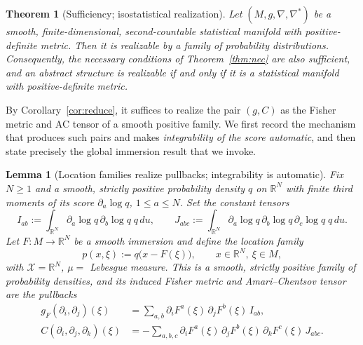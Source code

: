 \documentclass{amsart}
\newtheorem{theorem}{Theorem}
\newtheorem{lemma}{Lemma}
\theoremstyle{definition}
\theoremstyle{remark}
\begin{document}
\begin{theorem}[Sufficiency; isostatistical realization]\label{thm:suff}
Let $(M,g,\nabla,\nabla^{*})$ be a smooth, finite-dimensional, second-countable
statistical manifold with positive-definite metric. Then it is realizable by a
family of probability distributions. Consequently, the necessary conditions of
Theorem~\ref{thm:nec} are also sufficient, and an abstract structure is
realizable if and only if it is a statistical manifold with positive-definite
metric.
\end{theorem}

By Corollary~\ref{cor:reduce}, it suffices to realize the pair $(g,C)$ as the
Fisher metric and AC tensor of a smooth positive family. We first record the
mechanism that produces such pairs and makes \emph{integrability of the score
automatic}, and then state precisely the global immersion result that we invoke.

\begin{lemma}[Location families realize pullbacks; integrability is automatic]
\label{lem:location}
Fix $N\ge1$ and a smooth, strictly positive probability density $q$ on
$\mathbb R^{N}$ with finite third moments of its score $\partial_{a}\log q$,
$1\le a\le N$. Set the constant tensors
\[
  I_{ab}:=\int_{\mathbb R^{N}}\partial_{a}\log q\,\partial_{b}\log q\;q\,du,
  \qquad
  J_{abc}:=\int_{\mathbb R^{N}}\partial_{a}\log q\,\partial_{b}\log q\,
     \partial_{c}\log q\;q\,du .
\]
Let $F\colon M\to\mathbb R^{N}$ be a smooth immersion and define the
\emph{location family}
\begin{equation}\label{eq:locfam}
  p(x,\xi):=q\bigl(x-F(\xi)\bigr),\qquad x\in\mathbb R^{N},\ \xi\in M,
\end{equation}
with $\mathcal X=\mathbb R^{N}$, $\mu=$ Lebesgue measure. This is a smooth,
strictly positive family of probability densities, and its induced Fisher metric
and Amari--Chentsov tensor are the pullbacks
\begin{align}
  g_{F}(\partial_{i},\partial_{j})(\xi)
    &=\sum_{a,b}\partial_{i}F^{a}(\xi)\,\partial_{j}F^{b}(\xi)\,I_{ab},
    \label{eq:gpull}\\
  C(\partial_{i},\partial_{j},\partial_{k})(\xi)
    &=-\sum_{a,b,c}\partial_{i}F^{a}(\xi)\,\partial_{j}F^{b}(\xi)\,
       \partial_{k}F^{c}(\xi)\,J_{abc}.
    \label{eq:Cpull}
\end{align}
\end{lemma}
\end{document}
